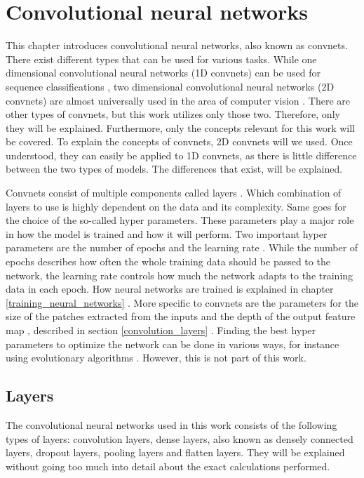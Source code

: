 

\chapter{Convolutional neural networks}
\label{convolutional_neural_networks}

This chapter introduces convolutional neural networks, also known as convnets. There exist different types that can be used for various tasks. While one dimensional convolutional neural networks (1D convnets) can be used for sequence classifications \cite[Chapter~6]{cnn}, two dimensional convolutional neural networks (2D convnets) are almost universally used in the area of computer vision \cite[Chapter~5]{cnn}. There are other types of convnets, but this work utilizes only those two. Therefore, only they will be explained. Furthermore, only the concepts relevant for this work will be covered. To explain the concepts of convnets, 2D convnets will we used. Once understood, they can easily be applied to 1D convnets, as there is little difference between the two types of models. The differences that exist, will be explained. 

Convnets consist of multiple components called layers \cite[Chapter~3]{cnn}. Which combination of layers to use is highly dependent on the data and its complexity. Same goes for the choice of the so-called hyper parameters. These parameters play a major role in how the model is trained and how it will perform. Two important hyper parameters are the number of epochs and the learning rate \cite[Chapter~4]{hyper}. While the number of epochs describes how often the whole training data should be passed to the network, the learning rate controls how much the network adapts to the training data in each epoch. How neural networks are trained is explained in chapter \ref{training_neural_networks} . More specific to convnets are the parameters for the size of the patches extracted from the inputs and the depth of the output feature map \cite[Chapter~5]{cnn}, described in section \ref{convolution_layers} . Finding the best hyper parameters to optimize the network can be done in various ways, for instance using evolutionary algorithms \cite{evolution}. However, this is not part of this work. 

\newpage

\section{Layers}
\label{layers}
The convolutional neural networks used in this work consists of the following types of layers: convolution layers, dense layers, also known as densely connected layers, dropout layers, pooling layers and flatten layers. They will be explained without going too much into detail about the exact calculations performed.

